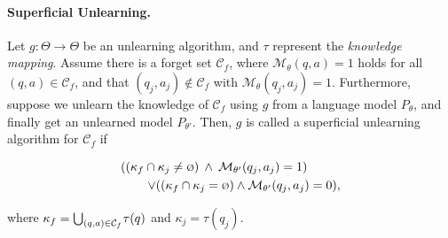 \paragraph{Superficial Unlearning.}
\label{def:sup_unlearn}
Let $g: \Theta \rightarrow \Theta$ be an unlearning algorithm, and $\tau$ represent the \textit{knowledge mapping}. Assume there is a forget set $\mathcal{C}_{f}$, where $\mathcal{M}_{\theta}(q,a) = 1$ holds for all $(q,a) \in \mathcal{C}_{f}$, and that $(q_{j}, a_{j}) \notin \mathcal{C}_{f}$ with $\mathcal{M}_{\theta}(q_{j},a_{j}) = 1$.
Furthermore, suppose we unlearn the knowledge of $\mathcal{C}_{f}$ using $g$ from a language model $P_{\theta}$, and finally get an unlearned model $P_{\theta'}$.
Then, $g$ is called a superficial unlearning algorithm for $\mathcal{C}_{f}$ if 


\vspace{-0.15cm}
\begin{equation}
\begin{aligned}
    ((\kappa_{f} \cap \kappa_{j} \neq \text{\scriptsize Ø}) \:\wedge\: \mathcal{M}_{\theta'}(q_{j},a_{j}) = 1)\:\:\:\:\:\:\:\:\:\:\:\:\\\:\:\:\:\:\:\:\:\ \vee ((\kappa_{f} \cap \kappa_{j} = \text{\scriptsize Ø}) \wedge \mathcal{M}_{\theta'}(q_{j},a_{j}) = 0),
\end{aligned}
\label{def:sup_unlearn}
\end{equation}

\noindent where $\kappa_{f} = \bigcup_{(q,a) \in \mathcal{C}_{f}}{\hspace{-0.05cm}\tau(q)}$ and $\kappa_{j} = \tau(q_{j})$.







